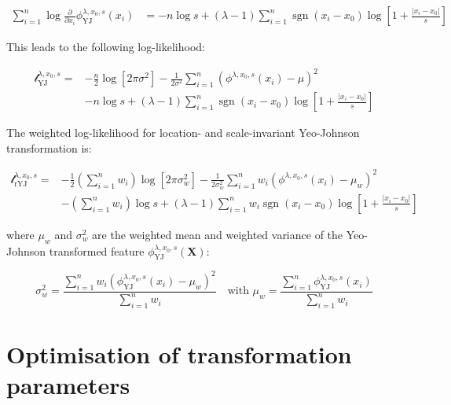 \documentclass[preprint,12pt,authoryear]{elsarticle}
\DeclareMathOperator{\sgn}{sgn}
\begin{document}
\begin{equation}
\begin{split}
\sum_{i=1}^n \log \frac{\partial}{\partial x_i} \phi_{\text{YJ}}^{\lambda, x_0, s}(x_i) & = - n \log s + (\lambda - 1) \sum_{i=1}^n \sgn(x_i - x_0) \log \left[1 + \frac{|x_i - x_0|}{s} \right]
\end{split}
\end{equation}

This leads to the following log-likelihood:

\begin{equation}
\begin{split}
\mathcal{l}_{\text{YJ}}^{\lambda, x_0, s} = & -\frac{n}{2} \log\left[2 \pi \sigma^2\right] -\frac{1}{2 \sigma^2} \sum_{i=1}^n \left( \phi^{\lambda, x_0, s}(x_i) - \mu \right)^2 \\
& - n \log s + (\lambda - 1) \sum_{i=1}^n \sgn(x_i - x_0) \log \left[1 + \frac{|x_i - x_0|}{s} \right]
\end{split}
\end{equation}

The weighted log-likelihood for location- and scale-invariant
Yeo-Johnson transformation is:

\begin{equation}
\begin{split}
\mathcal{l}_{\text{rYJ}}^{\lambda, x_0, s} = & -\frac{1}{2} \left(\sum_{i=1}^n w_i \right) \log \left[ 2 \pi \sigma_w^2 \right] -\frac{1}{2 \sigma_w^2} \sum_{i=1}^n w_i \left( \phi^{\lambda, x_0, s}(x_i) - \mu_w \right)^2 \\
& - \left( \sum_{i=1}^n w_i \right) \log s + (\lambda - 1) \sum_{i=1}^n w_i \sgn(x_i - x_0) \log \left[1 + \frac{|x_i - x_0|}{s} \right]
\end{split}
\end{equation}

where \(\mu_w\) and \(\sigma^2_w\) are the weighted mean and weighted
variance of the Yeo-Johnson transformed feature
\(\phi_{\text{YJ}}^{\lambda, x_0, s} (\mathbf{X})\):

\begin{equation}
\sigma_w^2 = \frac{\sum_{i=1}^n w_i \left(\phi_{\text{YJ}}^{\lambda, x_0, s} (x_i) - \mu_w \right)^2}{\sum_{i=1}^n w_i} \quad \text{with } \mu_w = \frac{\sum_{i=1}^n \phi_{\text{YJ}}^{\lambda, x_0, s} (x_i)} {\sum_{i=1}^n w_i}
\end{equation}

\section{Optimisation of transformation parameters}\label{appendix-b-optimisation-of-transformation-parameters}
\end{document}
